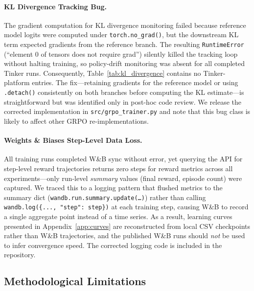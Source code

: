\paragraph{KL Divergence Tracking Bug.}
The gradient computation for KL divergence monitoring failed because reference
model logits were computed under \texttt{torch.no\_grad()}, but the downstream
KL term expected gradients from the reference branch. The resulting
\texttt{RuntimeError} (``element 0 of tensors does not require grad'') silently
killed the tracking loop without halting training, so policy-drift monitoring
was absent for all completed Tinker runs. Consequently, Table~\ref{tab:kl_divergence}
contains no Tinker-platform entries. The fix---retaining gradients for the
reference model or using \texttt{.detach()} consistently on both branches
before computing the KL estimate---is straightforward but was identified only
in post-hoc code review. We release the corrected implementation in
\texttt{src/grpo\_trainer.py} and note that this bug class is likely to affect
other GRPO re-implementations.

\paragraph{Weights \& Biases Step-Level Data Loss.}
All training runs completed W\&B sync without error, yet querying the API
for step-level reward trajectories returns zero steps for reward metrics across
all experiments---only run-level \emph{summary} values (final reward, episode
count) were captured. We traced this to a logging pattern that flushed metrics
to the summary dict (\texttt{wandb.run.summary.update(\ldots)}) rather than
calling \texttt{wandb.log(\{..., "step": step\})} at each training step,
causing W\&B to record a single aggregate point instead of a time series.
As a result, learning curves presented in Appendix~\ref{app:curves} are
reconstructed from local CSV checkpoints rather than W\&B trajectories, and
the published W\&B runs should \emph{not} be used to infer convergence speed.
The corrected logging code is included in the repository.

\subsection{Methodological Limitations}
\label{sec:method_limits}


